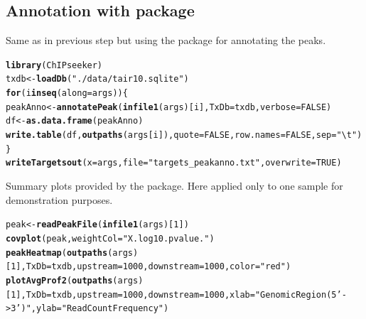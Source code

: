 \documentclass{article}\usepackage[]{graphicx}\usepackage[]{color}
\makeatletter
\newcommand{\hlnum}[1]{\textcolor[rgb]{0.686,0.059,0.569}{#1}}%
\newcommand{\hlstr}[1]{\textcolor[rgb]{0.192,0.494,0.8}{#1}}%
\newcommand{\hlstd}[1]{\textcolor[rgb]{0.345,0.345,0.345}{#1}}%
\newcommand{\hlkwa}[1]{\textcolor[rgb]{0.161,0.373,0.58}{\textbf{#1}}}%
\newcommand{\hlkwb}[1]{\textcolor[rgb]{0.69,0.353,0.396}{#1}}%
\newcommand{\hlkwc}[1]{\textcolor[rgb]{0.333,0.667,0.333}{#1}}%
\newcommand{\hlkwd}[1]{\textcolor[rgb]{0.737,0.353,0.396}{\textbf{#1}}}%
\newenvironment{kframe}{%
 \def\at@end@of@kframe{}%
 \ifinner\ifhmode%
  \def\at@end@of@kframe{\end{minipage}}%
  \begin{minipage}{\columnwidth}%
 \fi\fi%
 \def\FrameCommand##1{\hskip\@totalleftmargin \hskip-\fboxsep
 \colorbox{shadecolor}{##1}\hskip-\fboxsep
     \hskip-\linewidth \hskip-\@totalleftmargin \hskip\columnwidth}%
 \MakeFramed {\advance\hsize-\width
   \@totalleftmargin\z@ \linewidth\hsize
   \@setminipage}}%
 {\par\unskip\endMakeFramed%
 \at@end@of@kframe}
\newenvironment{knitrout}{}{} %
\makeatother
\begin{document}
\subsection{Annotation with  package}
Same as in previous step but using the  package for annotating the peaks.
\begin{knitrout}
\color{fgcolor}\begin{kframe}
\begin{alltt}
\hlkwd{library}\hlstd{(ChIPseeker)}
\hlstd{txdb} \hlkwb{<-} \hlkwd{loadDb}\hlstd{(}\hlstr{"./data/tair10.sqlite"}\hlstd{)}
\hlkwa{for}\hlstd{(i} \hlkwa{in} \hlkwd{seq}\hlstd{(}\hlkwc{along}\hlstd{=args)) \{}
    \hlstd{peakAnno} \hlkwb{<-} \hlkwd{annotatePeak}\hlstd{(}\hlkwd{infile1}\hlstd{(args)[i],} \hlkwc{TxDb}\hlstd{=txdb,} \hlkwc{verbose}\hlstd{=}\hlnum{FALSE}\hlstd{)}
    \hlstd{df} \hlkwb{<-} \hlkwd{as.data.frame}\hlstd{(peakAnno)}
    \hlkwd{write.table}\hlstd{(df,} \hlkwd{outpaths}\hlstd{(args[i]),} \hlkwc{quote}\hlstd{=}\hlnum{FALSE}\hlstd{,} \hlkwc{row.names}\hlstd{=}\hlnum{FALSE}\hlstd{,} \hlkwc{sep}\hlstd{=}\hlstr{"\textbackslash{}t"}\hlstd{)}
\hlstd{\}}
\hlkwd{writeTargetsout}\hlstd{(}\hlkwc{x}\hlstd{=args,} \hlkwc{file}\hlstd{=}\hlstr{"targets_peakanno.txt"}\hlstd{,} \hlkwc{overwrite}\hlstd{=}\hlnum{TRUE}\hlstd{)}
\end{alltt}
\end{kframe}
\end{knitrout}

Summary plots provided by the  package. Here applied only to one sample for demonstration purposes.
\begin{knitrout}
\color{fgcolor}\begin{kframe}
\begin{alltt}
\hlstd{peak} \hlkwb{<-} \hlkwd{readPeakFile}\hlstd{(}\hlkwd{infile1}\hlstd{(args)[}\hlnum{1}\hlstd{])}
\hlkwd{covplot}\hlstd{(peak,} \hlkwc{weightCol}\hlstd{=}\hlstr{"X.log10.pvalue."}\hlstd{)}
\hlkwd{peakHeatmap}\hlstd{(}\hlkwd{outpaths}\hlstd{(args)[}\hlnum{1}\hlstd{],} \hlkwc{TxDb}\hlstd{=txdb,} \hlkwc{upstream}\hlstd{=}\hlnum{1000}\hlstd{,} \hlkwc{downstream}\hlstd{=}\hlnum{1000}\hlstd{,} \hlkwc{color}\hlstd{=}\hlstr{"red"}\hlstd{)}
\hlkwd{plotAvgProf2}\hlstd{(}\hlkwd{outpaths}\hlstd{(args)[}\hlnum{1}\hlstd{],} \hlkwc{TxDb}\hlstd{=txdb,} \hlkwc{upstream}\hlstd{=}\hlnum{1000}\hlstd{,} \hlkwc{downstream}\hlstd{=}\hlnum{1000}\hlstd{,} \hlkwc{xlab}\hlstd{=}\hlstr{"Genomic Region (5'->3')"}\hlstd{,} \hlkwc{ylab} \hlstd{=} \hlstr{"Read Count Frequency"}\hlstd{)}
\end{alltt}
\end{kframe}
\end{knitrout}
\end{document}
